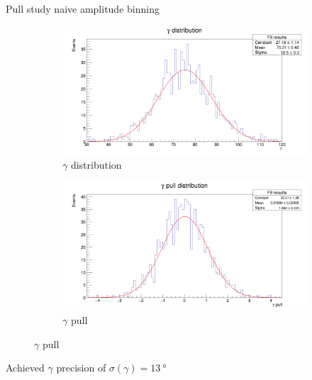 \documentclass{beamer}
\begin{document}
\begin{frame}{Pull study naive amplitude binning}
  \begin{figure}
    \centering
    \vspace{-0.2cm}
    \begin{subfigure}{0.5\textwidth}
      \includegraphics[width = 1.0\textwidth]{GammaDistribution8BinsFixedWidth.png}
      \caption{$\gamma$ distribution}
    \end{subfigure}%
    \begin{subfigure}{0.5\textwidth}
      \includegraphics[width = 1.0\textwidth]{GammaPull8BinsFixedWidth.png}
      \caption{$\gamma$ pull}
    \end{subfigure}
  \end{figure}
  \begin{center}
    Achieved $\gamma$ precision of $\sigma(\gamma) = \SI{13}{\degree}$
  \end{center}
\end{frame}
\end{document}
